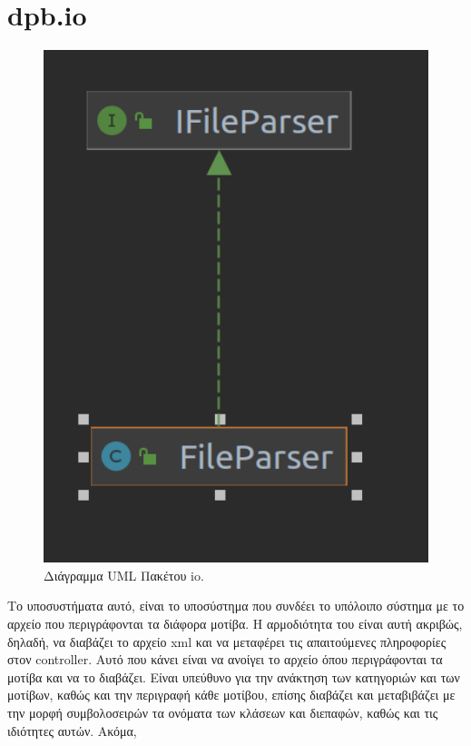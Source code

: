 \section{dpb.io}
\label{sec:dpb.io}
\begin{figure}[H]
    \centering
    \includegraphics[width=1.0\textwidth]{Figures/io.png}
    \caption{Διάγραμμα UML Πακέτου io.}
    \label{fig:ioUML}
\end{figure}
Το υποσυστήματα αυτό, είναι το υποσύστημα που συνδέει το υπόλοιπο σύστημα με το αρχείο που περιγράφονται τα διάφορα μοτίβα. 
Η αρμοδιότητα του είναι αυτή ακριβώς, δηλαδή,  να διαβάζει το αρχείο xml και να μεταφέρει τις απαιτούμενες πληροφορίες στον controller. 
Αυτό που κάνει είναι να ανοίγει το αρχείο όπου περιγράφονται τα μοτίβα και να το διαβάζει. 
Είναι υπεύθυνο για την ανάκτηση των κατηγοριών και των μοτίβων, καθώς και την περιγραφή κάθε μοτίβου, 
επίσης διαβάζει και μεταβιβάζει με την μορφή συμβολοσειρών τα ονόματα των κλάσεων και διεπαφών, καθώς και τις ιδιότητες αυτών. Ακόμα, 
